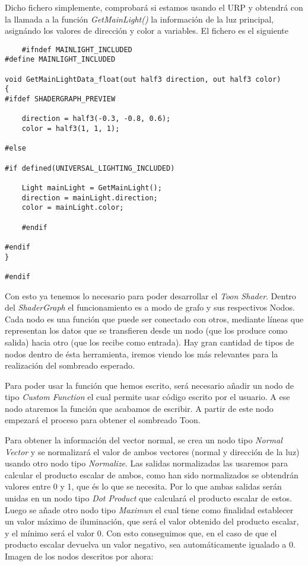 Dicho fichero simplemente, comprobará si estamos usando el URP y obtendrá con la llamada a la función \textit{GetMainLight()} la información de la luz principal, asignándo los valores de dirección y color a variables. El fichero es el siguiente

\begin{lstlisting}
    #ifndef MAINLIGHT_INCLUDED
#define MAINLIGHT_INCLUDED

void GetMainLightData_float(out half3 direction, out half3 color)
{
#ifdef SHADERGRAPH_PREVIEW

    direction = half3(-0.3, -0.8, 0.6);
    color = half3(1, 1, 1);

#else

#if defined(UNIVERSAL_LIGHTING_INCLUDED)

    Light mainLight = GetMainLight();
    direction = mainLight.direction;
    color = mainLight.color;

    #endif

#endif 
}

#endif
\end{lstlisting}

Con esto ya tenemos lo necesario para poder desarrollar el \textit{Toon Shader}. Dentro del \textit{ShaderGraph} el funcionamiento es a modo de grafo y sus respectivos Nodos. Cada nodo es una función que puede ser conectado con otros, mediante líneas que representan los datos que se transfieren desde un nodo (que los produce como salida) hacia otro (que los recibe como entrada). Hay gran cantidad de tipos de nodos dentro de ésta herramienta, iremos viendo los más relevantes para la realización del sombreado esperado.

Para poder usar la función que hemos escrito, será necesario añadir un nodo de tipo \textit{Custom Function} el cual permite usar código escrito por el usuario. A ese nodo ataremos la función que acabamos de escribir. A partir de este nodo empezará el proceso para obtener el sombreado Toon.

Para obtener la información del vector normal, se crea un nodo tipo \textit{Normal Vector} y se normalizará el valor de ambos vectores (normal y dirección de la luz) usando otro nodo tipo \textit{Normalize}. Las salidas normalizadas las usaremos para calcular el producto escalar de ambos, como han sido normalizados se obtendrán valores entre 0 y 1, que és lo que se necesita. Por lo que ambas salidas serán unidas en un nodo tipo \textit{Dot Product} que calculará el producto escalar de estos. Luego se añade otro nodo tipo \textit{Maximun} el cual tiene como finalidad establecer un valor máximo de iluminación, que será el valor obtenido del producto escalar, y el mínimo será el valor 0. Con esto conseguimos que, en el caso de que el producto escalar devuelva un valor negativo, sea automáticamente igualado a 0. Imagen de los nodos descritos por ahora: 


